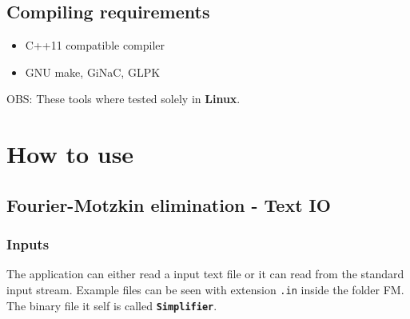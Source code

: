 \documentclass[12pt, a4paper]{report}
\begin{document}
\section{Compiling requirements}
\begin{itemize}
	\item C++11 compatible compiler
	\item GNU make, GiNaC, GLPK
\end{itemize}
{\color{red}OBS: These tools where tested solely in \textbf{Linux}.}

\chapter{How to use}
\section{Fourier-Motzkin elimination - Text IO}
\subsection{Inputs}
The application can either read a input text file or it can read from the standard input stream. Example files can be seen with extension \texttt{.in} inside the folder FM. The binary file it self is called {\color{red}\textbf{\texttt{Simplifier}}}.
\end{document}
